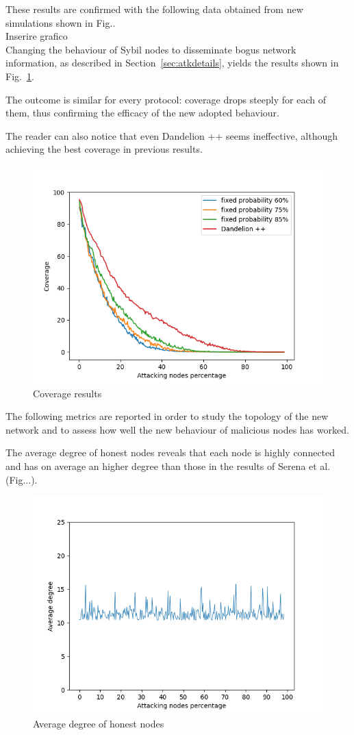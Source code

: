 \documentclass[12pt, letterpaper, twoside]{article}
\begin{document}
These results are confirmed with the following data obtained from new simulations shown in Fig..\\

Inserire grafico\\

Changing the behaviour of Sybil nodes to disseminate bogus network information, as described in Section~\ref{sec:atkdetails}, yields the results shown in Fig.~\ref{fig:in-cov}.

The outcome is similar for every protocol: coverage drops steeply for each of them, thus confirming the efficacy of the new adopted behaviour.

The reader can also notice that even Dandelion ++ seems ineffective, although achieving the best coverage in previous results.\\

\begin{figure}[h!]
	\includegraphics[width=.7\textwidth]{pict/results/in-cov.png}
	\centering 
	\caption{Coverage results}
	\label{fig:in-cov}
\end{figure}

The following metrics are reported in order to study the topology of the new network and to assess how well the new behaviour of malicious nodes has worked.

The average degree of honest nodes reveals that each node is highly connected and has on average an higher degree than those in the results of Serena et al. (Fig...). \\

\begin{figure}[h!]
	\includegraphics[width=.7\textwidth]{pict/results/in-hon-avg-neigh.png}
	\centering
	\caption{Average degree of honest nodes}
	\label{fig:degreehon}
\end{figure}
\end{document}
